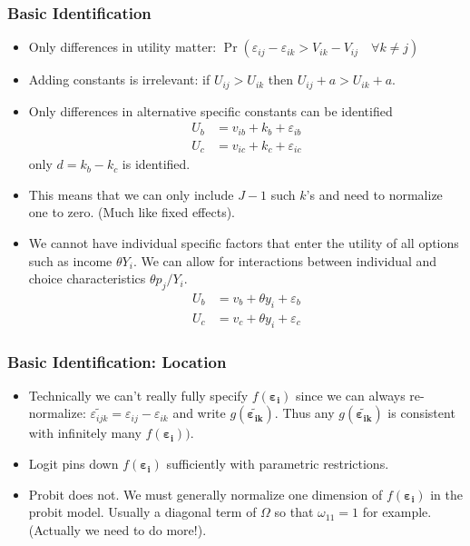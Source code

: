 \begin{frame}
\frametitle{Basic Identification}
\small
\begin{itemize}
\item Only differences in utility matter: $\Pr( \varepsilon_{ij}-\varepsilon_{ik} > V_{ik} - V_{ij} \quad \forall k \neq j)$
\item Adding constants is irrelevant: if $U_{ij} > U_{ik}$ then $U_{ij} + a > U_{ik} + a$.
\item Only differences in alternative specific constants can be identified
\begin{align*}
U_b &= v_{ib} + k_b  + \varepsilon_{ib}\\
U_c &= v_{ic} + k_c  + \varepsilon_{ic}
\end{align*}
only $d = k_b - k_c$ is identified.
\item This means that we can only include $J-1$ such $k$'s and need to normalize one to zero. (Much like fixed effects).
\item We cannot have individual specific factors that enter the utility of all options such as income $\theta Y_i$. We can allow for interactions between individual and choice characteristics $\theta p_{j}/ Y_i$.
\begin{align*}
U_b &= v_{b} + \theta y_i  + \varepsilon_b\\
U_c &= v_{c} + \theta y_i  + \varepsilon_c
\end{align*}

\end{itemize}
\end{frame}

\begin{frame}
\frametitle{Basic Identification: Location}
\begin{itemize}
\item Technically we can't really fully specify $f(\boldsymbol{\varepsilon_i})$ since we can always re-normalize: $\widetilde{\varepsilon_{ijk}} = \varepsilon_{ij} - \varepsilon_{ik}$ and write $g(\widetilde{\boldsymbol{\varepsilon_{ik}}})$. Thus any $g(\widetilde{\boldsymbol{\varepsilon_{ik}}})$ is consistent with infinitely many $f(\boldsymbol{\varepsilon_i}))$.
\item Logit pins down $f(\boldsymbol{\varepsilon_i})$ sufficiently with parametric restrictions.
\item Probit does not. We must generally normalize one dimension of $f(\boldsymbol{\varepsilon_i})$ in the probit model. Usually a diagonal term of $\Omega$ so that $\omega_{11} =1$ for example. (Actually we need to do more!).
\end{itemize}
\end{frame}



